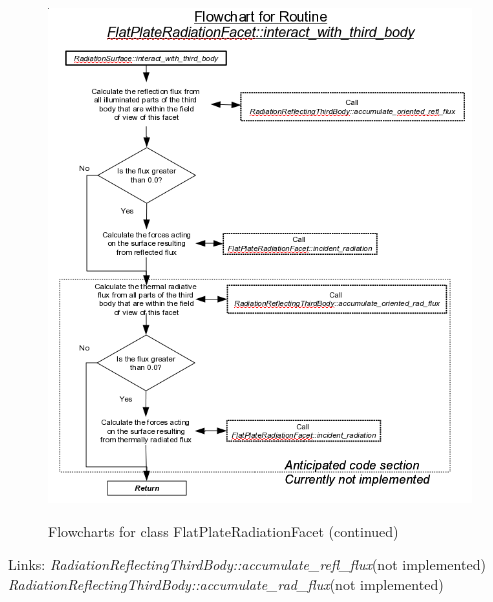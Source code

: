 \begin{figure}[!ht]
  \includegraphics[width = 6 in]{figs/flowchart/flow_FP_interact_with_third_body.png}
  \label{fig:flow_FP_interact_with_third_body}
  \caption{Flowcharts for class FlatPlateRadiationFacet (continued)}
  
\end{figure}
Links: \newline
{}\newline
\textit{RadiationReflectingThirdBody::accumulate\_refl\_flux}(not implemented) \newline
{}\newline
\textit{RadiationReflectingThirdBody::accumulate\_rad\_flux}(not implemented)
\clearpage

